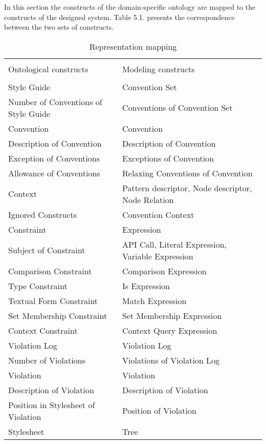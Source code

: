 \documentclass[parskip=full]{uvamscse}
\begin{document}
In this section the constructs of the domain-specific ontology are mapped to the constructs of the
designed system. Table 5.1. presents the correspondence between the two sets of constructs.

\begin{center}
\begin{longtable}{ | p{17em} | p{23em} | } 
\caption{Representation mapping}\\
\hline
 &  \\
Ontological constructs & Modeling constructs \\
 &  \\
\hline
Style Guide & Convention Set \\ \hline
Number of Conventions of Style Guide & Conventions of Convention Set \\ \hline
Convention & Convention \\ \hline
Description of Convention  & Description of Convention \\ \hline
Exception of Conventions & Exceptions of Convention \\ \hline
Allowance of Conventions & Relaxing Conventions of Convention \\ \hline
Context & Pattern descriptor, Node descriptor, Node Relation \\ \hline
Ignored Constructs & Convention Context \\ \hline
Constraint & Expression \\ \hline
Subject of Constraint & API Call, Literal Expression, Variable Expression \\ \hline
Comparison Constraint & Comparison Expression \\ \hline
Type Constraint & Is Expression \\ \hline
Textual Form Constraint & Match Expression \\ \hline
Set Membership Constraint & Set Membership Expression \\ \hline
Context Constraint & Context Query Expression \\ \hline
Violation Log & Violation Log \\ \hline
Number of Violations & Violations of Violation Log \\ \hline
Violation & Violation \\ \hline
Description of Violation & Description of Violation \\ \hline
Position in Stylesheet of Violation & Position of Violation \\ \hline
Stylesheet & Tree \\ \hline

\end{longtable}
\end{center}
\end{document}
